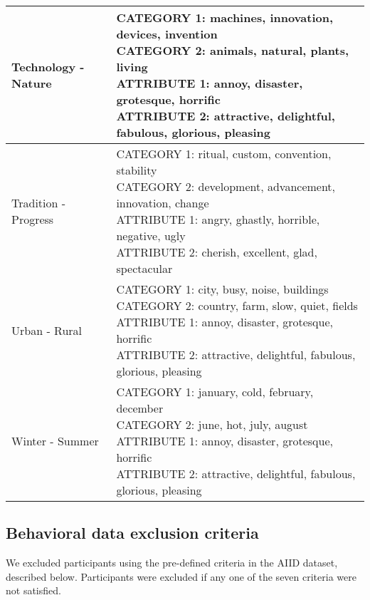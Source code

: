 \documentclass[]{article}
\begin{document}
\begin{table}[H]
\begin{tabular}{l|l}
\hline
Technology - Nature & \makecell[l]{CATEGORY 1:  machines, innovation, devices, invention \\ CATEGORY 2:  animals, natural, plants, living \\ ATTRIBUTE 1:  annoy, disaster, grotesque, horrific \\ ATTRIBUTE 2:  attractive, delightful, fabulous, glorious, pleasing \\}\\
\hline
Tradition - Progress & \makecell[l]{CATEGORY 1:  ritual, custom, convention, stability \\ CATEGORY 2:  development, advancement, innovation, change \\ ATTRIBUTE 1:  angry, ghastly, horrible, negative, ugly \\ ATTRIBUTE 2:  cherish, excellent, glad, spectacular \\}\\
\hline
Urban - Rural & \makecell[l]{CATEGORY 1:  city, busy, noise, buildings \\ CATEGORY 2:  country, farm, slow, quiet, fields \\ ATTRIBUTE 1:  annoy, disaster, grotesque, horrific \\ ATTRIBUTE 2:  attractive, delightful, fabulous, glorious, pleasing \\}\\
\hline
Winter - Summer & \makecell[l]{CATEGORY 1:  january, cold, february, december \\ CATEGORY 2:  june, hot, july, august \\ ATTRIBUTE 1:  annoy, disaster, grotesque, horrific \\ ATTRIBUTE 2:  attractive, delightful, fabulous, glorious, pleasing \\}\\
\hline
\end{tabular}
\endgroup{}
\end{table}

\hypertarget{behavioral-data-exclusion-criteria}{%
\subsection{Behavioral data exclusion
criteria}\label{behavioral-data-exclusion-criteria}}

We excluded participants using the pre-defined criteria in the AIID
dataset, described below. Participants were excluded if any one of the
seven criteria were not satisfied.
\end{document}
